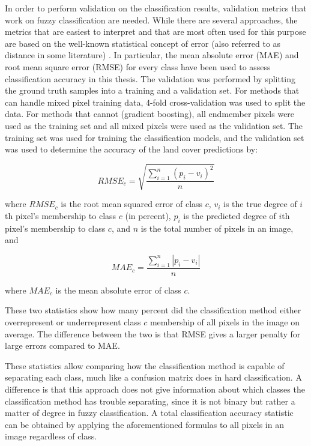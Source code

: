 \documentclass[a4paper,10pt]{book}
\begin{document}
In order to perform validation on the classification results, validation metrics that work on fuzzy classification are needed. While there are several approaches, the metrics that are easiest to interpret and that are most often used for this purpose are based on the well-known statistical concept of error (also referred to as distance in some literature) \citep{foody1996fuzzyevaluation}. In particular, the mean absolute error (MAE) and root mean square error (RMSE) for every class have been used to assess classification accuracy in this thesis. The validation was performed by splitting the ground truth samples into a training and a validation set. For methods that can handle mixed pixel training data, 4-fold cross-validation was used to split the data. For methods that cannot (gradient boosting), all endmember pixels were used as the training set and all mixed pixels were used as the validation set. The training set was used for training the classification models, and the validation set was used to determine the accuracy of the land cover predictions by:

$$ RMSE_c = \sqrt{ \frac{\displaystyle\sum_{i=1}^{n}{ (p_{i} - v_{i})^2 }}{n} } $$

where $ RMSE_c $ is the root mean squared error of class $ c $, $ v_{i} $ is the true degree of $ i $th pixel's membership to class $ c $ (in percent), $ p_i $ is the predicted degree of $ i $th pixel's membership to class $ c $, and $ n $ is the total number of pixels in an image, and

$$ MAE_c = \frac{\displaystyle\sum_{i=1}^{n}{ |p_{i} - v_{i}| }}{n} $$

where $ MAE_c $ is the mean absolute error of class $ c $.

These two statistics show how many percent did the classification method either overrepresent or underrepresent class $ c $ membership of all pixels in the image on average. The difference between the two is that RMSE gives a larger penalty for large errors compared to MAE.

These statistics allow comparing how the classification method is capable of separating each class, much like a confusion matrix does in hard classification. A difference is that this approach does not give information about which classes the classification method has trouble separating, since it is not binary but rather a matter of degree in fuzzy classification. A total classification accuracy statistic can be obtained by applying the aforementioned formulas to all pixels in an image regardless of class.
\end{document}
